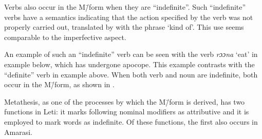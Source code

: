 \begin{exe}\let\eachwordone=\itshape
\end{exe}

Verbs also occur in the M\=/form when they are ``indefinite''.
Such ``indefinite'' verbs have a semantics indicating that
the action specified by the verb was not properly carried out,
translated by \citeauthor{en96} with the phrase `kind of'.
This use seems comparable to the imperfective aspect.

An example of such an ``indefinite'' verb can be seen with the verb \emph{rɔɔna} `eat'
in example  below, which has undergone apocope.
This example contrasts with the ``definite'' verb in example  above.
When both verb and noun are indefinite,
both occur in the M\=/form,
as shown in .

\begin{exe}\let\eachwordone=\itshape
\end{exe}
	
Metathesis, as one of the processes by which the M\=/form is derived,
has two functions in Leti:
it marks following nominal modifiers as attributive 
and it is employed to mark words as indefinite.
Of these functions, the first also occurs in Amarasi.